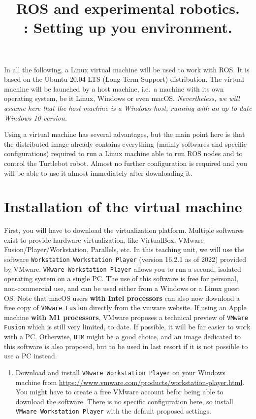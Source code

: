 \documentclass[10pt,a4paper,printanswers]{upmc}
\title{ROS and experimental robotics.\\ \Num: Setting up you environment.}
\newcounter{mainmemorder}
\newcommand{\save}{\setcounter{mainmemorder}{\value{enumi}}}
\newcommand{\subsecline}{\texorpdfstring{\hrulefill}{}}
\begin{document}
\maketitle

In all the following, a Linux virtual machine will be used to work with ROS. It is based on the
Ubuntu 20.04 LTS (Long Term Support) distribution. The virtual machine will be launched by a host
machine, i.e.\ a machine with its own operating system, be it Linux, Windows or even macOS.
\textit{Nevertheless, we will assume here that the host machine is a Windows host, running with an
  up to date Windows 10 version.}

Using a virtual machine has several advantages, but the main point here is that the distributed
image already contains everything (mainly softwares and specific configurations) required to run a
Linux machine able to run ROS nodes and to control the Turtlebot robot. Almost no further
configuration is required and you will be able to use it almost immediately after downloading it.

\section{Installation of the virtual machine\subsecline}

First, you will have to download the virtualization platform. Multiple softwares exist to provide
hardware virtualization, like VirtualBox, VMware Fusion/Player/Workstation, Parallels, etc. In this
teaching unit, we will use the software \texttt{Workstation Workstation Player} (version 16.2.1 as
of 2022) provided by VMware. \texttt{VMware Workstation Player} allows you to run a second, isolated
operating system on a single PC. The use of this software is free for personal, non-commercial use,
and can be used either from a Windows or a Linux guest OS. Note that macOS users \textbf{with Intel
  processors} can also now download a free copy of \texttt{VMware Fusion} directly from the vmware
website. If using an Apple machine \textbf{with M1 processors}, VMware proposes a technical preview
of \texttt{VMware Fusion} which is still very limited, to date. If possible, it will be far easier
to work with a PC. Otherwise, \texttt{UTM} might be a good choice, and an image dedicated to this
software is also proposed, but to be used in last resort if it is not possible to use a PC instead.

\begin{enumerate}
  \item Download and install \texttt{VMware Workstation Player} on your Windows machine from
        \url{https://www.vmware.com/products/workstation-player.html}. You might have to create a
        free VMware account befor being able to download the software. There is no specific
        configuration here, so install \texttt{VMware Workstation Player} with the default proposed
        settings.
        \save
\end{enumerate}
\end{document}
